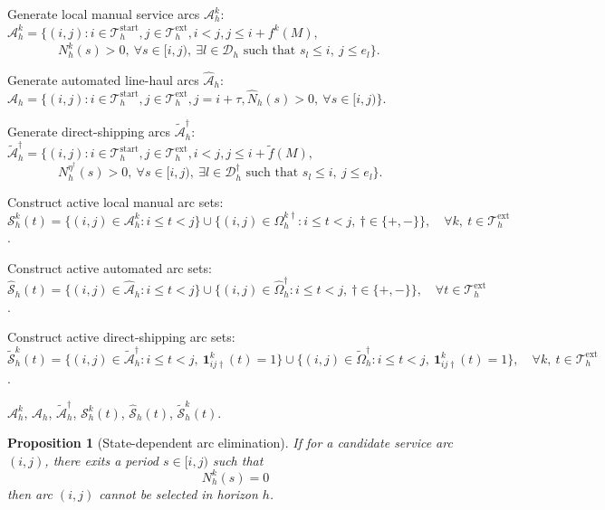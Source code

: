 \documentclass[10pt, reqno]{amsart}
\newtheorem{proposition}[theorem]{Proposition}
\begin{document}
\begin{algorithm}[!t]
\begin{algorithmic}[1]
\State Generate local manual service arcs $\mathcal{A}_h^k$:
\Statex \quad
$\mathcal{A}_h^k
=
\big\{
(i,j):
i\in\mathcal{T}_h^{\mathrm{start}},
j\in\mathcal{T}_h^{\mathrm{ext}},
i<j,
j\le i+f^k(M),$
\Statex
$\qquad\qquad
N_h^k(s)>0,\ \forall s\in[i,j),
\ \exists l\in\mathcal D_h
\text{ such that } s_l\le i,\ j\le e_l
\big\}$.

\State Generate automated line-haul arcs $\widehat{\mathcal{A}}_h$:
\Statex \quad
$\widehat{\mathcal{A}}_h
=
\big\{
(i,j):
i\in\mathcal{T}_h^{\mathrm{start}},
j\in\mathcal{T}_h^{\mathrm{ext}},
j=i+\tau,
\widehat N_h(s)>0,\ \forall s\in[i,j)
\big\}$.

\State Generate direct-shipping arcs $\widetilde{\mathcal{A}}_h^\dagger$:
\Statex \quad
$\widetilde{\mathcal{A}}_h^\dagger
=
\big\{
(i,j):
i\in\mathcal{T}_h^{\mathrm{start}},
j\in\mathcal{T}_h^{\mathrm{ext}},
i<j,
j\le i+\widetilde f(M),$
\Statex
$\qquad\qquad
N_h^{\eta^\dagger}(s)>0,\ \forall s\in[i,j),
\ \exists l\in\mathcal D_h^\dagger
\text{ such that } s_l\le i,\ j\le e_l
\big\}$.

\State Construct active local manual arc sets:
\Statex \quad
$\mathcal{S}_h^k(t)
=
\{(i,j)\in\mathcal{A}_h^k:i\le t<j\}
\cup
\{(i,j)\in\Omega_h^{k\dagger}:i\le t<j,\ \dagger\in\{+,-\}\},
\quad
\forall k,\ t\in\mathcal{T}_h^{\mathrm{ext}}$.

\State Construct active automated arc sets:
\Statex \quad
$\widehat{\mathcal{S}}_h(t)
=
\{(i,j)\in\widehat{\mathcal{A}}_h:i\le t<j\}
\cup
\{(i,j)\in\widehat{\Omega}_h^\dagger:i\le t<j,\ \dagger\in\{+,-\}\},
\quad
\forall t\in\mathcal{T}_h^{\mathrm{ext}}$.

\State Construct active direct-shipping arc sets:
\Statex \quad
$\widetilde{\mathcal{S}}_h^k(t)
=
\{(i,j)\in\widetilde{\mathcal{A}}_h^\dagger:
i\le t<j,\ \mathbf{1}_{ij\dagger}^k(t)=1\}
\cup
\{(i,j)\in\widetilde{\Omega}_h^\dagger:
i\le t<j,\ \mathbf{1}_{ij\dagger}^k(t)=1\},
\quad
\forall k,\ t\in\mathcal{T}_h^{\mathrm{ext}}$.

\State \Return 
$\mathcal{A}_h^k$, 
$\widehat{\mathcal{A}}_h$, 
$\widetilde{\mathcal{A}}_h^\dagger$, 
$\mathcal{S}_h^k(t)$, 
$\widehat{\mathcal{S}}_h(t)$, 
$\widetilde{\mathcal{S}}_h^k(t)$.

\end{algorithmic}
\end{algorithm}
\begin{proposition}[State-dependent arc elimination]\label{prop:rha can gen}
    If for a candidate service arc $(i,j)$, there exits a period $s\in[i,j)$ such that
    \[
    N^k_h(s)=0
    \]
    then arc $(i,j)$ cannot be selected in horizon $h$.
\end{proposition}
\end{document}
